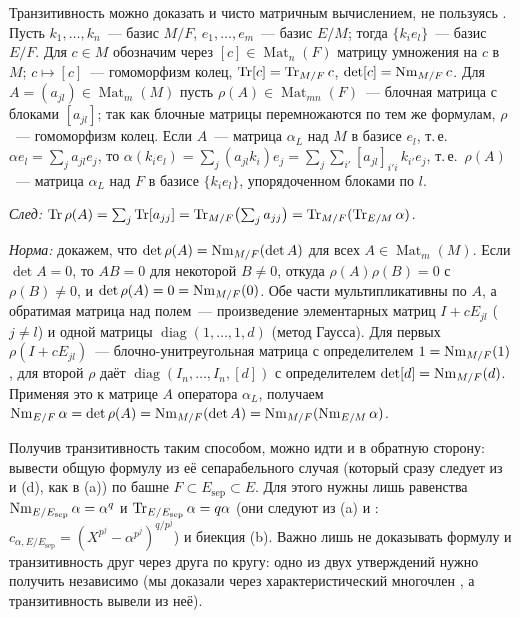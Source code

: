 \begin{remark}
Транзитивность можно доказать и чисто матричным вычислением, не пользуясь . Пусть $k_1,\dots,k_n$~--- базис $M/F$,
$e_1,\dots,e_m$~--- базис $E/M$; тогда $\{k_ie_l\}$~--- базис $E/F$. Для $c\in M$ обозначим через $[c]\in\operatorname{Mat}_n(F)$ матрицу
умножения на $c$ в $M$; $c\mapsto[c]$~--- гомоморфизм колец, $\operatorname{Tr}[c]=\operatorname{Tr}_{M/F}c$, $\det[c]=\operatorname{Nm}_{M/F}c$. Для
$A=(a_{jl})\in\operatorname{Mat}_m(M)$ пусть $\rho(A)\in\operatorname{Mat}_{mn}(F)$~--- блочная матрица с блоками $[a_{jl}]$; так как блочные матрицы
перемножаются по тем же формулам, $\rho$~--- гомоморфизм колец. Если $A$~--- матрица $\alpha_L$ над $M$ в базисе $e_l$,
т.\,е.\ $\alpha e_l=\sum_ja_{jl}e_j$, то $\alpha(k_ie_l)=\sum_j(a_{jl}k_i)e_j=\sum_j\sum_{i'}[a_{jl}]_{i'i}\,k_{i'}e_j$, т.\,е.\
$\rho(A)$~--- матрица $\alpha_L$ над $F$ в базисе $\{k_ie_l\}$, упорядоченном блоками по $l$.

\emph{След:} $\operatorname{Tr}\rho(A)=\sum_j\operatorname{Tr}[a_{jj}]=\operatorname{Tr}_{M/F}\bigl(\sum_ja_{jj}\bigr)=\operatorname{Tr}_{M/F}(\operatorname{Tr}_{E/M}\alpha)$.

\emph{Норма:} докажем, что $\det\rho(A)=\operatorname{Nm}_{M/F}(\det A)$ для всех $A\in\operatorname{Mat}_m(M)$. Если $\det A=0$, то $AB=0$ для
некоторой $B\ne0$, откуда $\rho(A)\rho(B)=0$ с $\rho(B)\ne0$, и $\det\rho(A)=0=\operatorname{Nm}_{M/F}(0)$. Обе части мультипликативны
по $A$, а обратимая матрица над полем~--- произведение элементарных матриц $I+cE_{jl}$ ($j\ne l$) и одной матрицы
$\operatorname{diag}(1,\dots,1,d)$ (метод Гаусса). Для первых $\rho(I+cE_{jl})$~--- блочно-унитреугольная матрица с
определителем $1=\operatorname{Nm}_{M/F}(1)$, для второй $\rho$ даёт $\operatorname{diag}(I_n,\dots,I_n,[d])$ с определителем
$\det[d]=\operatorname{Nm}_{M/F}(d)$. Применяя это к матрице $A$ оператора $\alpha_L$, получаем
$\operatorname{Nm}_{E/F}\alpha=\det\rho(A)=\operatorname{Nm}_{M/F}(\det A)=\operatorname{Nm}_{M/F}(\operatorname{Nm}_{E/M}\alpha)$.

Получив транзитивность таким способом, можно идти и в обратную сторону: вывести общую формулу  из её
сепарабельного случая (который сразу следует из \rf{5.45} и \rf{5.46a}(d), как в \rf{5.47a}(a)) по башне
$F\subset E_{\mathrm{sep}}\subset E$. Для этого нужны лишь равенства $\operatorname{Nm}_{E/E_{\mathrm{sep}}}\alpha=\alpha^q$ и
$\operatorname{Tr}_{E/E_{\mathrm{sep}}}\alpha=q\alpha$ (они следуют из (a) и \rf{5.44}: $c_{\alpha,E/E_{\mathrm{sep}}}=
(X^{p^j}-\alpha^{p^j})^{q/p^j}$) и биекция \rf{5.47c}(b). Важно лишь не доказывать формулу  и транзитивность друг через
друга по кругу: одно из двух утверждений нужно получить независимо (мы доказали \rf{5.47} через характеристический
многочлен \rf{5.44}, а транзитивность вывели из неё).
\end{remark}

